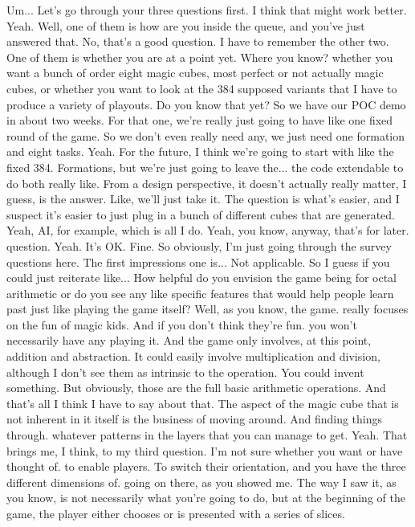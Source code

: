 \documentclass{article}
\begin{document}
Um...
Let's go through your three questions first. I think that might work better. Yeah. Well, one of them is how are you inside the queue, and you've just answered that.
No, that's a good question.
I have to remember the other two. One of them is whether you are at a point yet.
Where you know?
whether you want a bunch of order eight magic cubes, most perfect or not actually magic cubes, or whether you want to look at the 384 supposed variants that I have to produce a variety of playouts. Do you know that yet?
So we have our POC demo in about two weeks. For that one, we're really just going to have like one fixed round of the game. So we don't even really need any, we just need one formation and eight tasks. Yeah. For the future, I think we're going to start with like the fixed 384.
Formations, but we're just going to leave the...
the code extendable to do both really like.
From a design perspective, it doesn't actually really matter, I guess, is the answer. Like, we'll just take it. The question is what's easier, and I suspect it's easier to just plug in a bunch of different cubes that are generated. Yeah, AI, for example, which is all I do. Yeah, you know, anyway, that's for later.
question. Yeah.
It's OK. Fine.
So obviously, I'm just going through the survey questions here. The first impressions one is...
Not applicable.
So I guess if you could just reiterate like...
How helpful do you envision the game being for octal arithmetic or do you see any like specific features that would help people learn past just like playing the game itself?
Well, as you know, the game.
really focuses on the fun of magic kids. And if you don't think they're fun.
you won't necessarily have any playing it. And the game only involves, at this point, addition and abstraction.
It could easily involve multiplication and division, although I don't see them as intrinsic to the operation. You could invent something.
But obviously, those are the full basic arithmetic operations.
And that's all I think I have to say about that.
The aspect of the magic cube that is not inherent in it itself is the business of moving around.
And finding things through.
whatever patterns in the layers that you can manage to get. Yeah.
That brings me, I think, to my third question. I'm not sure whether you want or have thought of.
to enable players.
To switch their orientation, and you have the three different dimensions of.
going on there, as you showed me.
The way I saw it, as you know, is not necessarily what you're going to do, but at the beginning of the game, the player either chooses or is presented with a series of slices.
\end{document}
